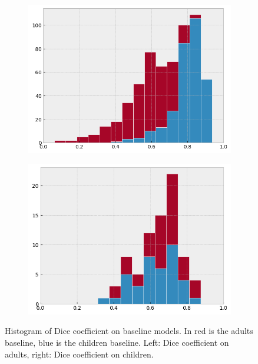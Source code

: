 \begin{figure}[htb]
  \begin{subfigure}[b]{0.5\linewidth}
    \centering
    \includegraphics[width=0.95\linewidth]{img_transfer/hist_adults} 
  \end{subfigure}%
  \begin{subfigure}[b]{0.5\linewidth}
    \centering
    \includegraphics[width=0.95\linewidth]{img_transfer/hist_children} 
  \end{subfigure} 
  \caption{Histogram of Dice coefficient on baseline models. In red is the adults baseline, blue is the children baseline. Left: Dice coefficient on adults, right: Dice coefficient on children.}
  \label{fig:hist} 
\end{figure}

